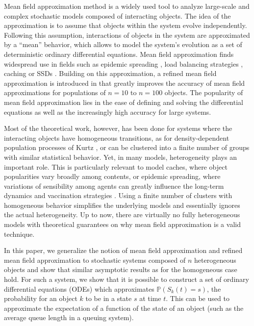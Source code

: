 \documentclass[acmsmall]{acmart}
\newcommand\Proba[1]{\mathbb{P}\left(#1\right)} %
\begin{document}
Mean field approximation method is a widely used tool to analyze large-scale and complex stochastic models composed of interacting objects. The idea of the approximation is to assume that objects within the system evolve independently. Following this assumption, interactions of objects in the system are approximated by a ``mean'' behavior, which allows to model the system's evolution as a set of deterministic ordinary differential equations. Mean field approximation finds widespread use in fields such as epidemic spreading \cite{montalbanHerdImmunityIndividual2020,dearrudaFundamentalsSpreadingProcesses2018}, load balancing strategies \cite{mukhopadhyayAnalysisLoadBalancing2015,mitzenmacherPowerTwoChoices2001}, caching \cite{gastTransientSteadystateRegime2015} or SSDs \cite{vanhoudtMeanFieldModel2013}. Building on this approximation, a refined mean field approximation is introduced in \cite{gastRefinedMeanField2017,gastSizeExpansionsMean2019} that greatly improves the accuracy of mean field approximations for populations of $n=10$ to $n=100$ objects. The popularity of mean field approximation lies in the ease of defining and solving the differential equations as well as the increasingly high accuracy for large systems. 

Most of the theoretical work, however, has been done for systems where the interacting objects have homogeneous transitions, as for density-dependent population processes of Kurtz \cite{kurtzStrongApproximationTheorems1978}, or can be clustered into a finite number of groups with similar statistical behavior. Yet, in many models, heterogeneity plays an important role. This is particularly relevant to model caches, where object popularities vary broadly among contents, or epidemic spreading, where variations of sensibility among agents can greatly influence the long-term dynamics and vaccination strategies \cite{gomesIndividualVariationSusceptibility2020}.  Using a finite number of clusters with homogeneous behavior simplifies the underlying models and essentially ignores the actual heterogeneity. Up to now, there are virtually no fully heterogeneous models with theoretical guarantees on why mean field approximation is a valid technique.

In this paper, we generalize the notion of mean field approximation and refined mean field approximation to stochastic systems composed of $n$  heterogeneous objects and show that similar asymptotic results as for the homogeneous case hold. For such a system, we show that it is possible to construct a set of ordinary differential equations (ODEs) which approximates $\Proba{S_k(t)=s}$, the probability for an object $k$ to be in a state $s$ at time $t$. {\color{myorange}This can be used to approximate the expectation of a function of the state of an object (such as the average queue length in a queuing system).}
\end{document}

